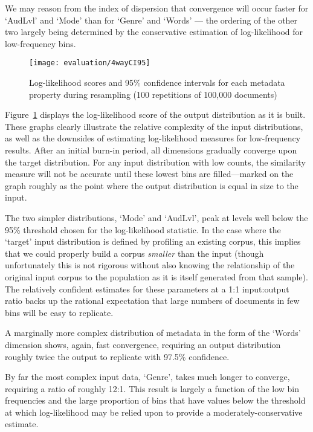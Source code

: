We may reason from the index of dispersion that convergence will occur faster for `AudLvl' and `Mode' than for `Genre' and `Words' --- the ordering of the other two largely being determined by the conservative estimation of log-likelihood for low-frequency bins.


\begin{figure}[ht]
    \centering
    \texttt{[image: evaluation/4wayCI95]}
    \caption{Log-likelihood scores and 95\% confidence intervals for each metadata property during resampling (100 repetitions of 100,000 documents)}
    \label{fig:evaluation:resampling:4wayCI95}
\end{figure}


Figure~\ref{fig:evaluation:resampling:4wayCI95} displays the log-likelihood score of the output distribution as it is built.  These graphs clearly illustrate the relative complexity of the input distributions, as well as the downsides of estimating log-likelihood measures for low-frequency results.  After an initial burn-in period, all dimensions gradually converge upon the target distribution.  For any input distribution with low counts, the similarity measure will not be accurate until these lowest bins are filled---marked on the graph roughly as the point where the output distribution is equal in size to the input.%

The two simpler distributions, `Mode' and `AudLvl', peak at levels well below the 95\% threshold chosen for the log-likelihood statistic.  In the case where the `target' input distribution is defined by profiling an existing corpus, this implies that we could properly build a corpus \textit{smaller} than the input (though unfortunately this is not rigorous without also knowing the relationship of the original input corpus to the population as it is itself generated from that sample).  The relatively confident estimates for these parameters at a 1:1 input:output ratio backs up the rational expectation that large numbers of documents in few bins will be easy to replicate.

A marginally more complex distribution of metadata in the form of the `Words' dimension shows, again, fast convergence, requiring an output distribution roughly twice the output to replicate with 97.5\% confidence.

By far the most complex input data, `Genre', takes much longer to converge, requiring a ratio of roughly 12:1.  This result is largely a function of the low bin frequencies and the large proportion of bins that have values below the threshold at which log-likelihood may be relied upon to provide a moderately-conservative estimate.

